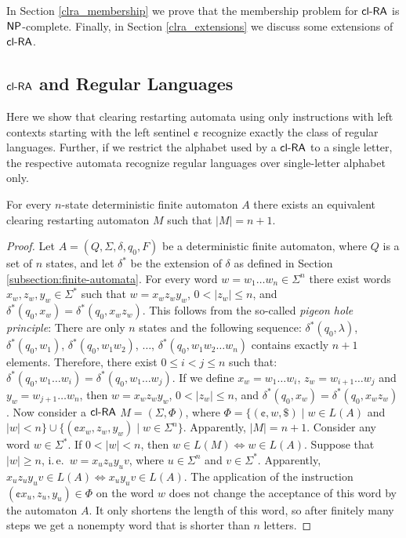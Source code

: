 In Section \ref{clra_membership} we prove that the membership problem for $\mbox{\sf cl-RA\/}$ is $\NP$-complete. Finally, in Section \ref{clra_extensions} we discuss some extensions of $\mbox{\sf cl-RA\/}$.

\subsection{$\mbox{\sf cl-RA\/}$ and Regular Languages}
\label{se:clRAandReg}

Here we show that clearing restarting automata using only instructions with left contexts starting with the left sentinel $\cent$ recognize exactly the class of regular languages. Further, if we restrict the alphabet used by a $\mbox{\sf cl-RA\/}$ to a single letter, the respective automata recognize regular languages over single-letter alphabet only.

\begin{theorem}\label{theorem:regular_to_clra}
For every $n$-state deterministic finite automaton $A$ there exists an equivalent  clearing restarting automaton $M$ such that $|M| = n+1$. 
\end{theorem}

\begin{proof}
Let $A = (Q, \Sigma, \delta, q_0, F)$ be a deterministic finite automaton, where $Q$ is a set of $n$ states, and let $\delta^*$ be the extension of $\delta$ as defined in Section \ref{subsection:finite-automata}. For every word $w = w_1 \ldots w_n \in \Sigma^n$ there exist words $x_w, z_w, y_w \in \Sigma^*$ such that $w = x_w z_w y_w$, $0 < |z_w| \le n$, and $\delta^*(q_0, x_w) = \delta^*(q_0, x_w z_w)$. This follows from the so-called \emph{pigeon hole principle}: There are only $n$ states and the following sequence: $\delta^*(q_0, \lambda)$, $\delta^*(q_0, w_1)$, $\delta^*(q_0, w_1 w_2)$, $\ldots$, $\delta^*(q_0, w_1 w_2 \ldots w_n)$ contains exactly $n+1$ elements. Therefore, there exist $0 \le i < j \le n$ such that: $\delta^*(q_0, w_1 \ldots w_i) = \delta^*(q_0, w_1 \ldots w_j)$. If we define $x_w = w_1 \ldots w_i$, $z_w = w_{i+1} \ldots w_j$ and $y_w = w_{j+1} \ldots w_n$, then $w = x_w z_w y_w$, $0 < |z_w| \le n$, and $\delta^*(q_0, x_w) = \delta^*(q_0, x_w z_w)$. Now consider a $\mbox{\sf cl-RA\/}$ $M = (\Sigma, \Phi)$, where $\Phi = \{ (\cent, w, \$) \mid w \in L(A)$ and $|w| < n\} \cup \{(\cent x_w, z_w, y_w) \mid w \in \Sigma^n\}$. Apparently, $|M| = n + 1$. Consider any word $w \in \Sigma^*$. If $0 < |w| < n$, then $w \in L(M) \Leftrightarrow w \in L(A)$. Suppose that $|w| \ge n$, i.\,e.\ $w = x_u z_u y_u v$, where $u \in \Sigma^n$ and $v \in \Sigma^*$. Apparently, $x_u z_u y_u v \in L(A) \Leftrightarrow x_u y_u v \in L(A)$. The application of the instruction $(\cent x_u, z_u, y_u) \in \Phi$ on the word $w$ does not change the acceptance of this word by the automaton $A$. It only shortens the length of this word, so after finitely many steps we get a nonempty word that is shorter than $n$ letters.
\end{proof}

